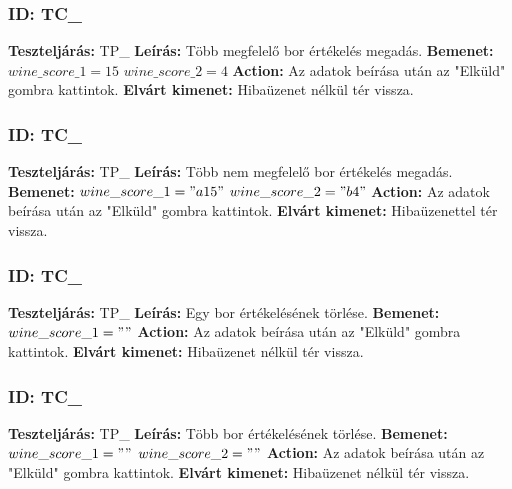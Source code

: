 \documentclass[12pt]{report}
\theoremstyle{definition}
\begin{document}
	\subsubsection{ID: TC\_}\addtocounter{TC}{1}
	\textbf{Teszteljárás:} TP\_
	\newline 
	\textbf{Leírás:} Több megfelelő bor értékelés megadás.
	\newline 
	\textbf{Bemenet:} $wine\_score\_1 = 15$ $wine\_score\_2 = 4$
	\newline 
	\textbf{Action:} Az adatok beírása után az "Elküld" gombra kattintok.
	\newline 
	\textbf{Elvárt kimenet:} Hibaüzenet nélkül tér vissza.
	
	\subsubsection{ID: TC\_}\addtocounter{TC}{1}
	\textbf{Teszteljárás:} TP\_
	\newline 
	\textbf{Leírás:} Több nem megfelelő bor értékelés megadás.
	\newline 
	\textbf{Bemenet:} $wine\_score\_1 = "a15"$ $wine\_score\_2 = "b4"$
	\newline 
	\textbf{Action:} Az adatok beírása után az "Elküld" gombra kattintok.
	\newline 
	\textbf{Elvárt kimenet:} Hibaüzenettel tér vissza.
	
	\subsubsection{ID: TC\_}\addtocounter{TC}{1}
	\textbf{Teszteljárás:} TP\_
	\newline 
	\textbf{Leírás:} Egy bor értékelésének törlése.
	\newline 
	\textbf{Bemenet:} $wine\_score\_1 = ""$
	\newline 
	\textbf{Action:} Az adatok beírása után az "Elküld" gombra kattintok.
	\newline 
	\textbf{Elvárt kimenet:} Hibaüzenet nélkül tér vissza.
	
	\subsubsection{ID: TC\_}\addtocounter{TC}{1}
	\textbf{Teszteljárás:} TP\_
	\newline 
	\textbf{Leírás:} Több bor értékelésének törlése.
	\newline 
	\textbf{Bemenet:} $wine\_score\_1 = ""$ $wine\_score\_2 = ""$
	\newline 
	\textbf{Action:} Az adatok beírása után az "Elküld" gombra kattintok.
	\newline 
	\textbf{Elvárt kimenet:} Hibaüzenet nélkül tér vissza.
	
\end{document}
